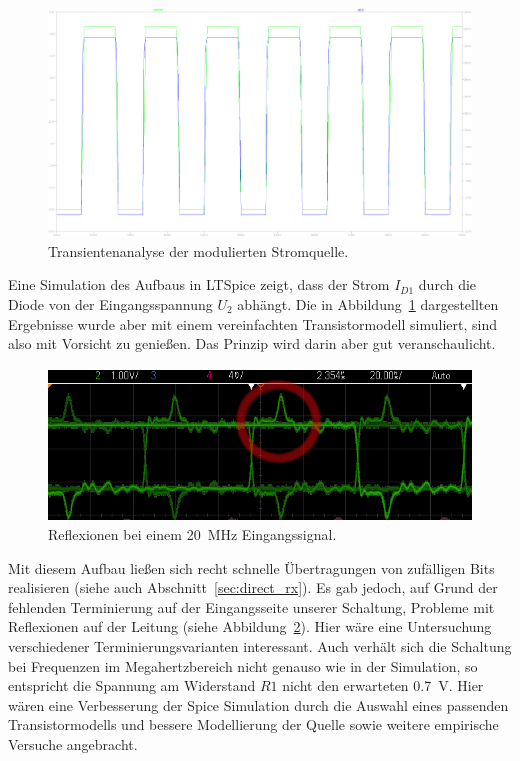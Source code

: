 \documentclass[12pt,a4paper]{article}
\begin{document}
\begin{figure}[H]
  \centering
    \includegraphics[width=1.0\textwidth]{../spice/current_input_v_current_out_trans.png}
  \caption{Transientenanalyse der modulierten Stromquelle.}
  \label{fig:modulated_current_source_plot}
\end{figure}


Eine Simulation des Aufbaus in LTSpice zeigt, dass der Strom $I_{D1}$ durch die Diode von der Eingangsspannung $U_2$ abhängt. Die in Abbildung~\ref{fig:modulated_current_source_plot} dargestellten Ergebnisse wurde aber mit einem vereinfachten Transistormodell simuliert, sind also mit Vorsicht zu genießen. Das Prinzip wird darin aber gut veranschaulicht.

\begin{figure}[H]
  \centering
    \includegraphics[width=1.0\textwidth]{img/ring_20MHz.png}
  \caption{Reflexionen bei einem \SI{20}{\mega\hertz} Eingangssignal.}
  \label{fig:ring_20mhz}
\end{figure}

Mit diesem Aufbau ließen sich recht schnelle Übertragungen von zufälligen Bits realisieren (siehe auch Abschnitt~\ref{sec:direct_rx}). Es gab jedoch, auf Grund der fehlenden Terminierung auf der Eingangsseite unserer Schaltung, Probleme mit Reflexionen auf der Leitung (siehe Abbildung~\ref{fig:ring_20mhz}). Hier wäre eine Untersuchung verschiedener Terminierungsvarianten interessant. Auch verhält sich die Schaltung bei Frequenzen im Megahertzbereich nicht genauso wie in der Simulation, so entspricht die Spannung am Widerstand $R1$ nicht den erwarteten \SI{0.7}{\volt}. Hier wären eine Verbesserung der Spice Simulation durch die Auswahl eines passenden Transistormodells und bessere Modellierung der Quelle sowie weitere empirische Versuche angebracht.
\end{document}
